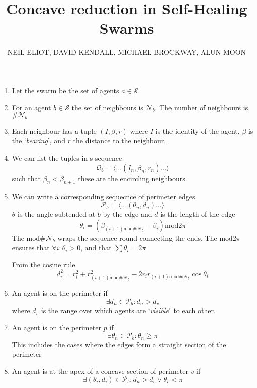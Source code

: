 \documentclass{ieeeaccess}
\begin{document}
\renewcommand{\caption}[1]{}
\title{Concave reduction in Self-Healing Swarms}
\author{\uppercase{Neil Eliot},
\uppercase{David Kendall, Michael Brockway, Alun Moon}}
\address[1]{Northumbria University, Department of Computing and Information Sciences, Newcastle upon Tyne, NE1 8ST}

\begin{enumerate}
	\item Let the swarm be the set of agents $a\in\mathcal{S}$

	\item For an agent $b\in\mathcal{S}$ the set of neighbours is $\mathcal{N}_b$.
		The number of neighbours is $\#\mathcal{N}_b$
	
	\item Each neighbour has a tuple $(I,\beta,r)$ where $I$ is the identity of the agent,
		$\beta$ is the `\emph{bearing}', and $r$ the distance to the neighbour.
	
	\item We can list the tuples in s sequence 
		\[ \mathcal{Q}_b = \langle \ldots (I_n,\beta_n,r_n) \ldots \rangle \]
		such that $\beta_n<\beta_{n+1}$ these are the encircling neighbours.
	
	\item We can write a corresponding sequecnce of perimeter edges
		\[ \mathcal{P}_b = \langle \ldots (\theta_n,d_n) \ldots \rangle \]
		$\theta$ is the angle subtended at $b$ by the edge and $d$ is the length of the edge
		\[ \theta_i = (\beta_{(i+1)\mathrm{mod} \#\mathcal{N}_b} - \beta_i)\mathrm{mod}2\pi \]
		The $\mathrm{mod}\#\mathcal{N}_b$ wraps the sequence round connecting the ends.
		The $\mathrm{mod}2\pi$ ensures that $\forall i : \theta_i>0$, 
		and that $\sum\theta_i = 2\pi$

		From the cosine rule
		\[ d_i^2 = r_i^2 + r_{(i+1)\mathrm{mod}\#\mathcal{N}_b}^2 - 2 r_i 
			r_{(i+1)\mathrm{mod}\#\mathcal{N}_b} \cos \theta_i
		\]

	\item An agent is on the perimeter if
		\[
			\exists d_n \in \mathcal{P}_b : d_n>d_v
		\]
		where $d_v$ is the range over which agents are `\emph{visible}' to each other.
	
	\item An agent is on the perimeter $p$ if
		\[
			\exists \theta_n \in \mathcal{P}_b : \theta_n\geq\pi
		\]
		This includes the cases where the edges form a straight section of the perimeter

	\item An agent is at the apex of a concave section of perimeter $v$ if
		\[ 
			\exists (\theta_i,d_i) \in \mathcal{P}_b : d_n>d_v \vee \theta_i<\pi
		\]
\end{enumerate}
\end{document}
